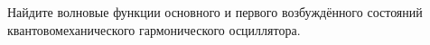 \documentclass[__main__.tex]{subfiles}
\begin{document}
Найдите волновые функции основного и первого возбуждённого состояний квантовомеханического гармонического осциллятора.\\ 

\end{document}
